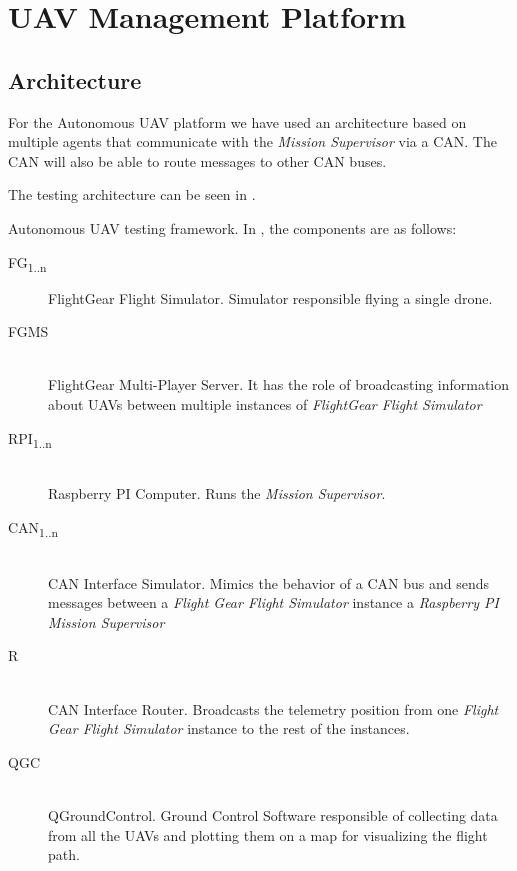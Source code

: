 \chapter{UAV Management Platform}
\label{chapter:uav-management-framework}

\section{Architecture}
\label{sec:architecture}
For the Autonomous UAV platform we have used an architecture based on multiple
agents that communicate with the \textit{Mission Supervisor} via a CAN.
The CAN will also be able to route messages
to other CAN buses. 

The testing architecture can be seen in  .

{Autonomous UAV testing framework.}
\newpage
In , the components are as
follows:
\begin{description}
\item [FG\textsubscript{1..n}] FlightGear Flight Simulator. Simulator responsible
flying a single drone.
\item [FGMS] \hfill \\ FlightGear Multi-Player Server. It has the role of broadcasting
information about UAVs between multiple instances of \textit{FlightGear Flight Simulator}
\item [RPI\textsubscript{1..n}] \hfill \\Raspberry PI Computer. Runs the \textit{Mission Supervisor}.
\item [CAN\textsubscript{1..n}] \hfill \\ CAN Interface Simulator. Mimics the behavior of 
a CAN bus and sends messages between a \textit{Flight Gear Flight Simulator} 
instance a \textit{Raspberry PI Mission Supervisor}
\item [R] \hfill \\ CAN Interface Router. Broadcasts the telemetry position from one
\textit{Flight Gear Flight Simulator} instance to the rest of the instances.
\item [QGC] \hfill \\ QGroundControl. Ground Control Software responsible of collecting data
from all the UAVs and plotting them on a map for visualizing the flight path.
\end{description}


